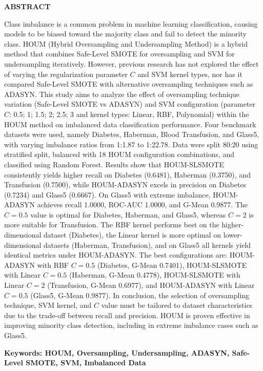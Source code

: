 \clearpage
{}%
\thispagestyle{fancy}

\begin{center}
	\large \bfseries \MakeUppercase{Abstract}\\
	\bigskip
	
	\normalsize \normalfont \justifying \singlespacing
	Class imbalance is a common problem in machine learning classification, causing models to be biased toward the majority class and fail to detect the minority class. HOUM (Hybrid Oversampling and Undersampling Method) is a hybrid method that combines Safe-Level SMOTE for oversampling and SVM for undersampling iteratively. However, previous research has not explored the effect of varying the regularization parameter $C$ and SVM kernel types, nor has it compared Safe-Level SMOTE with alternative oversampling techniques such as ADASYN. This study aims to analyze the effect of oversampling technique variation (Safe-Level SMOTE vs ADASYN) and SVM configuration (parameter $C$: 0.5; 1; 1.5; 2; 2.5; 3 and kernel types: Linear, RBF, Polynomial) within the HOUM method on imbalanced data classification performance. Four benchmark datasets were used, namely Diabetes, Haberman, Blood Transfusion, and Glass5, with varying imbalance ratios from 1:1.87 to 1:22.78. Data were split 80:20 using stratified split, balanced with 18 HOUM configuration combinations, and classified using Random Forest. Results show that HOUM-SLSMOTE consistently yields higher recall on Diabetes (0.6481), Haberman (0.3750), and Transfusion (0.7500), while HOUM-ADASYN excels in precision on Diabetes (0.7234) and Glass5 (0.6667). On Glass5 with extreme imbalance, HOUM-ADASYN achieves recall 1.0000, ROC-AUC 1.0000, and G-Mean 0.9877. The $C=0.5$ value is optimal for Diabetes, Haberman, and Glass5, whereas $C=2$ is more suitable for Transfusion. The RBF kernel performs best on the higher-dimensional dataset (Diabetes), the Linear kernel is more optimal on lower-dimensional datasets (Haberman, Transfusion), and on Glass5 all kernels yield identical metrics under HOUM-ADASYN. The best configurations are: HOUM-ADASYN with RBF $C=0.5$ (Diabetes, G-Mean 0.7401), HOUM-SLSMOTE with Linear $C=0.5$ (Haberman, G-Mean 0.4778), HOUM-SLSMOTE with Linear $C=2$ (Transfusion, G-Mean 0.6977), and HOUM-ADASYN with Linear $C=0.5$ (Glass5, G-Mean 0.9877). In conclusion, the selection of oversampling technique, SVM kernel, and $C$ value must be tailored to dataset characteristics due to the trade-off between recall and precision. HOUM is proven effective in improving minority class detection, including in extreme imbalance cases such as Glass5.
    
    \vspace{20pt}
	\raggedright\textbf{Keywords: HOUM, Oversampling, Undersampling, ADASYN, Safe-Level SMOTE, SVM, Imbalanced Data}
	
	\vfill
	
\end{center}
\clearpage